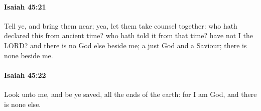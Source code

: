 		\paragraph{Isaiah 45:21} %
			\label{ISAIAH-45-21}

			Tell ye, and bring them near; yea, let them take counsel together: who hath declared this from ancient time? who hath told it from that time? have not I the LORD? and there is no God else beside me; a just God and a Saviour; there is none beside me.


		\paragraph{Isaiah 45:22} %
			\label{ISAIAH-45-22}

			Look unto me, and be ye saved, all the ends of the earth: for I am God, and there is none else.


